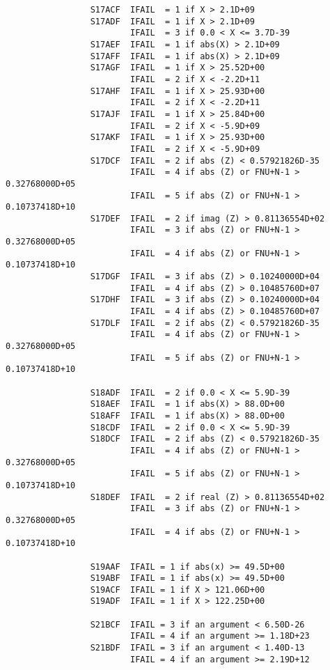 \begin{small}
\begin{verbatim}
                 S17ACF  IFAIL  = 1 if X > 2.1D+09
                 S17ADF  IFAIL  = 1 if X > 2.1D+09
                         IFAIL  = 3 if 0.0 < X <= 3.7D-39
                 S17AEF  IFAIL  = 1 if abs(X) > 2.1D+09
                 S17AFF  IFAIL  = 1 if abs(X) > 2.1D+09
                 S17AGF  IFAIL  = 1 if X > 25.52D+00
                         IFAIL  = 2 if X < -2.2D+11
                 S17AHF  IFAIL  = 1 if X > 25.93D+00
                         IFAIL  = 2 if X < -2.2D+11
                 S17AJF  IFAIL  = 1 if X > 25.84D+00
                         IFAIL  = 2 if X < -5.9D+09
                 S17AKF  IFAIL  = 1 if X > 25.93D+00
                         IFAIL  = 2 if X < -5.9D+09
                 S17DCF  IFAIL  = 2 if abs (Z) < 0.57921826D-35
                         IFAIL  = 4 if abs (Z) or FNU+N-1 > 0.32768000D+05
                         IFAIL  = 5 if abs (Z) or FNU+N-1 > 0.10737418D+10
                 S17DEF  IFAIL  = 2 if imag (Z) > 0.81136554D+02
                         IFAIL  = 3 if abs (Z) or FNU+N-1 > 0.32768000D+05
                         IFAIL  = 4 if abs (Z) or FNU+N-1 > 0.10737418D+10
                 S17DGF  IFAIL  = 3 if abs (Z) > 0.10240000D+04
                         IFAIL  = 4 if abs (Z) > 0.10485760D+07
                 S17DHF  IFAIL  = 3 if abs (Z) > 0.10240000D+04
                         IFAIL  = 4 if abs (Z) > 0.10485760D+07
                 S17DLF  IFAIL  = 2 if abs (Z) < 0.57921826D-35
                         IFAIL  = 4 if abs (Z) or FNU+N-1 > 0.32768000D+05
                         IFAIL  = 5 if abs (Z) or FNU+N-1 > 0.10737418D+10

                 S18ADF  IFAIL  = 2 if 0.0 < X <= 5.9D-39
                 S18AEF  IFAIL  = 1 if abs(X) > 88.0D+00
                 S18AFF  IFAIL  = 1 if abs(X) > 88.0D+00
                 S18CDF  IFAIL  = 2 if 0.0 < X <= 5.9D-39
                 S18DCF  IFAIL  = 2 if abs (Z) < 0.57921826D-35
                         IFAIL  = 4 if abs (Z) or FNU+N-1 > 0.32768000D+05
                         IFAIL  = 5 if abs (Z) or FNU+N-1 > 0.10737418D+10
                 S18DEF  IFAIL  = 2 if real (Z) > 0.81136554D+02
                         IFAIL  = 3 if abs (Z) or FNU+N-1 > 0.32768000D+05
                         IFAIL  = 4 if abs (Z) or FNU+N-1 > 0.10737418D+10

                 S19AAF  IFAIL = 1 if abs(x) >= 49.5D+00
                 S19ABF  IFAIL = 1 if abs(x) >= 49.5D+00
                 S19ACF  IFAIL = 1 if X > 121.06D+00
                 S19ADF  IFAIL = 1 if X > 122.25D+00

                 S21BCF  IFAIL = 3 if an argument < 6.50D-26
                         IFAIL = 4 if an argument >= 1.18D+23
                 S21BDF  IFAIL = 3 if an argument < 1.40D-13
                         IFAIL = 4 if an argument >= 2.19D+12


\end{verbatim}
\end{small}
